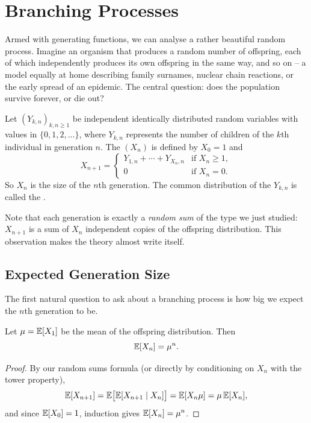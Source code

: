\documentclass[a4paper]{scrartcl}
\begin{document}
\section{Branching Processes}

Armed with generating functions, we can analyse a rather beautiful random process. Imagine an organism that produces a random number of offspring, each of which independently produces its own offspring in the same way, and so on -- a model equally at home describing family surnames, nuclear chain reactions, or the early spread of an epidemic. The central question: does the population survive forever, or die out?

\begin{definition}
	Let $(Y_{k, n})_{k, n \geq 1}$ be independent identically distributed random variables with values in $\{0, 1, 2, \dots\}$, where $Y_{k, n}$ represents the number of children of the $k$th individual in generation $n$. The  $(X_n)$ is defined by $X_0 = 1$ and
	$$
	X_{n + 1} = \begin{cases}
		Y_{1, n} + \cdots + Y_{X_n, n} & \text{if } X_n \geq 1, \\
		0 & \text{if } X_n = 0.
	\end{cases}
	$$
	So $X_n$ is the size of the $n$th generation. The common distribution of the $Y_{k,n}$ is called the .
\end{definition}

Note that each generation is exactly a \emph{random sum} of the type we just studied: $X_{n+1}$ is a sum of $X_n$ independent copies of the offspring distribution. This observation makes the theory almost write itself.

\subsection{Expected Generation Size}

The first natural question to ask about a branching process is how big we expect the $n$th generation to be.

\begin{theorem}
	Let $\mu = \mathbb{E}[X_1]$ be the mean of the offspring distribution. Then
	$$
	\mathbb{E}[X_n] = \mu^n.
	$$
\end{theorem}
\begin{proof}
	By our random sums formula (or directly by conditioning on $X_n$ with the tower property),
	$$
	\mathbb{E}[X_{n + 1}] = \mathbb{E}\big[\mathbb{E}[X_{n+1} \mid X_n]\big] = \mathbb{E}[X_n \mu] = \mu\, \mathbb{E}[X_n],
	$$
	and since $\mathbb{E}[X_0] = 1$, induction gives $\mathbb{E}[X_n] = \mu^n$.
\end{proof}
\end{document}
